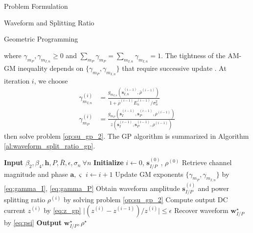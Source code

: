 \documentclass{IEEEtran}
\begin{document}
\begin{section}{Problem Formulation}
\begin{subsection}{Waveform and Splitting Ratio}
\begin{subsubsection}{Geometric Programming}
\begin{mini}
			\end{mini}
			where $\gamma_{m_P},\gamma_{m_{I,n}} \ge 0$ and $\sum_{m_P}\gamma_{m_P}=\sum_{m_{I,n}}\gamma_{m_{I,n}}=1$. The tightness of the AM-GM inequality depends on $\{\gamma_{m_P},\gamma_{m_{I,n}}\}$ that require successive update \cite{Clerckx2018b}. At iteration $i$, we choose
			\begin{align}
				\gamma_{m_{I,n}}^{(i)} & = \frac{g_{m_{I,n}}(\boldsymbol{s}_{I,n}^{(i-1)},\bar{\rho}^{(i-1)})}{1+{\bar{\rho}^{(i-1)}E_n^{(i-1)}}/{\sigma_n^2}}\label{eq:gamma_I}\\
				\gamma_{m_P}^{(i)} & = \frac{g_{m_P}(\boldsymbol{s}_I^{(i-1)},\boldsymbol{s}_P^{(i-1)},\rho^{(i-1)})}{z(\boldsymbol{s}_I^{(i-1)},\boldsymbol{s}_P^{(i-1)},\rho^{(i-1)})}\label{eq:gamma_P}
			\end{align}
			then solve problem \ref{op:su_gp_2}. The GP algorithm is summarized in Algorithm \ref{al:waveform_split_ratio_gp}.
			\begin{algorithm}
				\caption{GP: Waveform and Splitting Ratio}
				\label{al:waveform_split_ratio_gp}
				\begin{algorithmic}[1]
					\State \textbf{Input} $\beta_2,\beta_4,\boldsymbol{h},P,\bar{R},\epsilon,\sigma_n \ \forall n$
					\State \textbf{Initialize} $i \gets 0$, $\boldsymbol{s}_{I/P}^{(0)}$, $\rho^{(0)}$
					\State Retrieve channel magnitude and phase $\boldsymbol{a}, \varsigma$
					\Repeat
					\State $i \gets i + 1$
					\State Update GM exponents $\{\gamma_{m_P},\gamma_{m_{I,n}}\}$ by \ref{eq:gamma_I}, \ref{eq:gamma_P}
					\State Obtain waveform amplitude $\boldsymbol{s}_{I/P}^{(i)}$ and power splitting ratio $\rho^{(i)}$ by solving problem \ref{op:su_gp_2}
					\State Compute output DC current $z^{(i)}$ by \ref{eq:z_gp}
					\Until $\lvert (z^{(i)} - z^{(i-1)}) / z^{(i)} \rvert \le \epsilon$
					\State Recover waveform $\boldsymbol{w}_{I/P}^{\star}$ by \ref{eq:psi}
					\State \textbf{Output} $\boldsymbol{w}_{I/P}^{\star}, \rho^{\star}$
				\end{algorithmic}
			\end{algorithm}
		\end{subsubsection}


\end{subsection}
\end{section}
\end{document}
